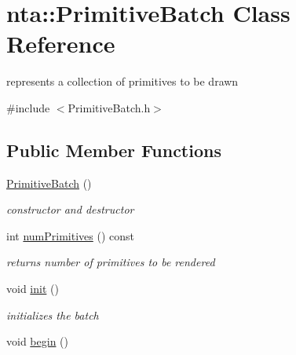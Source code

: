 \hypertarget{classnta_1_1PrimitiveBatch}{}\section{nta\+:\+:Primitive\+Batch Class Reference}
\label{classnta_1_1PrimitiveBatch}


represents a collection of primitives to be drawn  




{\ttfamily \#include $<$Primitive\+Batch.\+h$>$}

\subsection*{Public Member Functions}
\begin{DoxyCompactItemize}
\item 
\mbox{\label{classnta_1_1PrimitiveBatch_a28628a90db31796dd0d1cf770dbe9ff5}} 
\hyperlink{classnta_1_1PrimitiveBatch_a28628a90db31796dd0d1cf770dbe9ff5}{Primitive\+Batch} ()
\begin{DoxyCompactList}\small\item\em constructor and destructor \end{DoxyCompactList}\item 
\mbox{\label{classnta_1_1PrimitiveBatch_a3cf74d5aaf9e56b0d98512ba8b94d01f}} 
int \hyperlink{classnta_1_1PrimitiveBatch_a3cf74d5aaf9e56b0d98512ba8b94d01f}{num\+Primitives} () const
\begin{DoxyCompactList}\small\item\em returns number of primitives to be rendered \end{DoxyCompactList}\item 
\mbox{\label{classnta_1_1PrimitiveBatch_a425c70802333e18a6cd019aec145f07b}} 
void \hyperlink{classnta_1_1PrimitiveBatch_a425c70802333e18a6cd019aec145f07b}{init} ()
\begin{DoxyCompactList}\small\item\em initializes the batch \end{DoxyCompactList}\item 
\mbox{\label{classnta_1_1PrimitiveBatch_a589f1ebad11f83187f2ce8f81875fe22}} 
void \hyperlink{classnta_1_1PrimitiveBatch_a589f1ebad11f83187f2ce8f81875fe22}{begin} ()

\end{DoxyCompactItemize}
